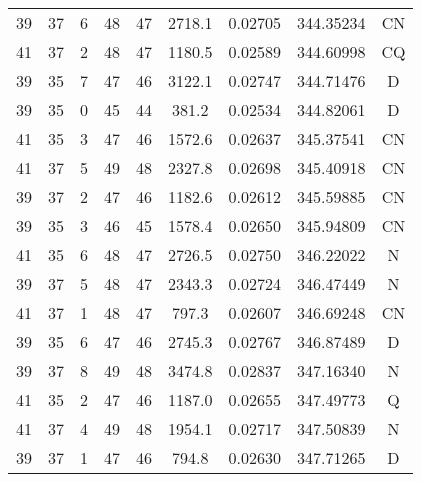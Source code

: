 \begin{table*}[htp]
\begin{tabular}{ccccccccc}
39 & 37 & 6 & 48 & 47 & 2718.1 & 0.02705 & 344.35234 & CN \\
41 & 37 & 2 & 48 & 47 & 1180.5 & 0.02589 & 344.60998 & CQ \\
39 & 35 & 7 & 47 & 46 & 3122.1 & 0.02747 & 344.71476 & D \\
39 & 35 & 0 & 45 & 44 & 381.2 & 0.02534 & 344.82061 & D \\
41 & 35 & 3 & 47 & 46 & 1572.6 & 0.02637 & 345.37541 & CN \\
41 & 37 & 5 & 49 & 48 & 2327.8 & 0.02698 & 345.40918 & CN \\
39 & 37 & 2 & 47 & 46 & 1182.6 & 0.02612 & 345.59885 & CN \\
39 & 35 & 3 & 46 & 45 & 1578.4 & 0.02650 & 345.94809 & CN \\
41 & 35 & 6 & 48 & 47 & 2726.5 & 0.02750 & 346.22022 & N \\
39 & 37 & 5 & 48 & 47 & 2343.3 & 0.02724 & 346.47449 & N \\
41 & 37 & 1 & 48 & 47 & 797.3 & 0.02607 & 346.69248 & CN \\
39 & 35 & 6 & 47 & 46 & 2745.3 & 0.02767 & 346.87489 & D \\
39 & 37 & 8 & 49 & 48 & 3474.8 & 0.02837 & 347.16340 & N \\
41 & 35 & 2 & 47 & 46 & 1187.0 & 0.02655 & 347.49773 & Q \\
41 & 37 & 4 & 49 & 48 & 1954.1 & 0.02717 & 347.50839 & N \\
39 & 37 & 1 & 47 & 46 & 794.8 & 0.02630 & 347.71265 & D \\
\hline
\end{tabular}

\par 
\end{table*}
